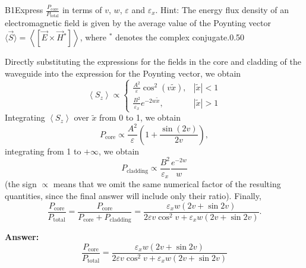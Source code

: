 \documentclass[11pt,a4paper]{article}
\begin{document}
\begin{solcard}{B1}{Express $\frac{P_\mathrm{core}}{P_\mathrm{total}}$ in terms of $v$, $w$, $\varepsilon$ and $\varepsilon_x$. Hint: The energy flux density of an electromagnetic field is given by the average value of the Poynting vector $\langle\vec S\rangle=\left<[\vec E\times\vec H{}^*]\right>$, where ${}^*$ denotes the complex conjugate.}{0.50}

Directly substituting the expressions for the fields in the core and cladding of the waveguide into the expression for the Poynting vector, we obtain \[\left< S_z\right>\propto\begin{cases}\frac{A^2}{\varepsilon}\cos^2(v\tilde x),&|\tilde x| < 1\\\frac{B^2}{\varepsilon_x}e^{-2w\tilde x},&|\tilde x| > 1\end{cases}\] Integrating $\left< S_z\right>$ over $\tilde x$ from 0 to 1, we obtain \[P_\mathrm{core}\propto\frac{A^2}{\varepsilon}\left(1+\frac{\sin(2v)}{2v}\right),\] integrating from 1 to $+\infty$, we obtain \[P_\mathrm{cladding}\propto\frac{B^2}{\varepsilon_x}\frac{e^{-2w}}w\] (the sign $\propto$ means that we omit the same numerical factor of the resulting quantities, since the final answer will include only their ratio). Finally,\[\frac{P_\mathrm{core}}{P_\mathrm{total}}=\frac{P_\mathrm{core}}{P_\mathrm{core}+P_\mathrm{cladding}}=\frac{\varepsilon_xw(2v+\sin2v)}{2\varepsilon v\cos^2v+\varepsilon_xw(2v+\sin2v)}.\]

\par\smallskip\noindent\textbf{Answer:} \[\frac{P_\mathrm{core}}{P_\mathrm{total}}=\frac{\varepsilon_xw(2v+\sin2v)}{2\varepsilon v\cos^2v+\varepsilon_xw(2v+\sin2v)}\]
\end{solcard}
\end{document}

